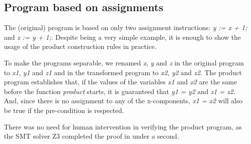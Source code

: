 \subsection{Program based on assignments}
\label{sub:results_assignments}

The (original) program is based on only two assignment instructions: \emph{y := x + 1;} and \emph{z := y + 1;}.
Despite being a very simple example, it is enough to show the usage of the product construction rules in practice.

To make the programs separable, we renamed \emph{x}, \emph{y} and \emph{z} in the original program to \emph{x1}, \emph{y1} and \emph{z1} and in the transformed program to \emph{x2}, \emph{y2} and \emph{z2}.
The product program establishes that, if the values of the variables \emph{x1} and \emph{x2} are the same before the function \emph{product} starts, it is guaranteed that \emph{y1 = y2} and \emph{z1 = z2}.
And, since there is no assignment to any of the x-components, \emph{x1 = x2} will also be true if the pre-condition is respected.

There was no need for human intervention in verifying the product program, as the SMT solver Z3 completed the proof in under a second.


